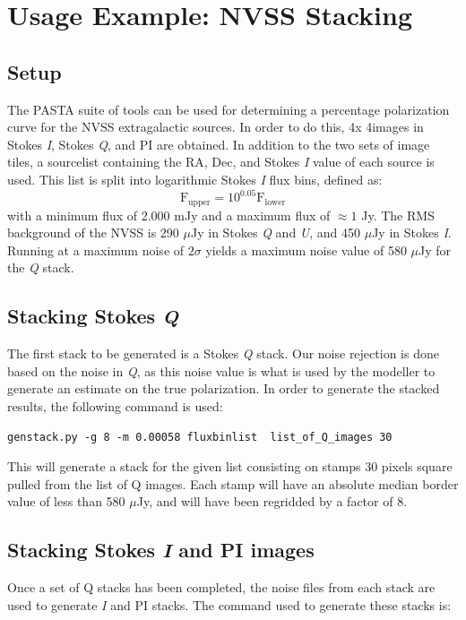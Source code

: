 \documentclass{article}
\begin{document}
\section{Usage Example: NVSS Stacking}
\subsection{Setup}
The PASTA suite of tools can be used for determining a percentage 
polarization curve for the NVSS extragalactic sources.  In order to do this,  
4\degree x 4\degree images in Stokes \emph{I}, Stokes \emph{Q}, and PI are 
obtained.  In addition to the two sets of image tiles, a sourcelist containing 
the RA, Dec, and Stokes \emph{I} value of each source is used.  This list 
is split into logarithmic Stokes \emph{I} flux bins, defined as:
$$\mathrm{F_{upper}} = 10^{0.05}\mathrm{F_{lower}}$$
with a minimum flux of 2.000 mJy and a maximum flux of $\approx1$ Jy. The RMS
background of the NVSS is 290 $\mu$Jy in Stokes \emph{Q} and \emph{U}, and 
450 $\mu$Jy in Stokes \emph{I}.  Running at a maximum noise of $2\sigma$ yields
a maximum noise value of 580 $\mu$Jy for the \emph{Q} stack.

\subsection{Stacking Stokes \emph{Q}}
The first stack to be generated is a Stokes \emph{Q} stack.  Our noise 
rejection is done based on the noise in \emph{Q}, as this noise value is what
is used by the modeller to generate an estimate on the true polarization.  In 
order to generate the stacked results, the following command is used:
\begin{center}
\verb!genstack.py -g 8 -m 0.00058 fluxbinlist  list_of_Q_images 30!
\end{center}

This will generate a stack for the given list consisting on stamps 30 pixels 
square pulled from the list of Q images.  Each stamp will have an absolute 
median border value of less than 580 $\mu$Jy, and will have been regridded by a
factor of 8.

\subsection{Stacking Stokes \emph{I} and PI images}
Once a set of Q stacks has been completed, the noise files from each stack are
used to generate \emph{I} and PI stacks.  The command used to generate these
stacks is:
\end{document}
